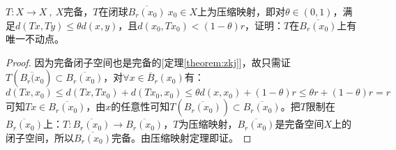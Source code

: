 \begin{example}
\quad $T:X \to X \ , \ X$完备，$T$在闭球$\overline{B_r(x_0)} \ x_0 \in X$上为压缩映射，即对$\theta \in (0,1)$，满足$d(Tx,Ty) \leq \theta d(x,y)$，且$d(x_0,Tx_0)<(1-\theta)r$，证明：$T$在$\overline{B_r(x_0)}$上有唯一不动点。
\end{example}
\begin{proof}
因为完备闭子空间也是完备的[定理\ref{theorem:zkj}]，故只需证$T(\overline{B_r(x_0}) \subset \overline{B_r(x_0)}$，对$\forall x \in \overline{B}_r(x_0)$有：
\[d(Tx,x_0) \leq d(Tx,Tx_0)+d(Tx_0,x_0) \leq \theta d(x,x_0)+(1-\theta)r \leq \theta r+(1-\theta)r=r\]
可知$Tx \in \overline{B_r(x_0)}$，由$x$的任意性可知$T(\overline{B_r(x_0)}) \subset \overline{B_r(x_0)}$。把$T$限制在$\overline{B_r(x_0)}$上：$T:\overline{B_r(x_0)} \to \overline{B_r(x_0)}$，$T$为压缩映射，$\overline{B_r(x_0)}$是完备空间$X$上的闭子空间，所以$\overline{B_r(x_0)}$完备。由压缩映射定理即证。
\end{proof}

